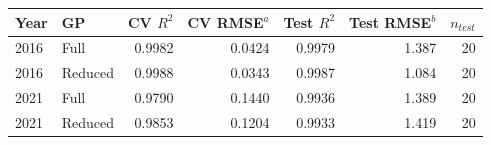 \begin{tabular}{@{}llrrrrr@{}}
\toprule
Year & GP & CV $R^2$ & CV RMSE$^{a}$ & Test $R^2$ & Test RMSE$^{b}$ & $n_{test}$ \\
\midrule
2016 & Full & 0.9982 & 0.0424 & 0.9979 & 1.387 & 20 \\
2016 & Reduced & 0.9988 & 0.0343 & 0.9987 & 1.084 & 20 \\
2021 & Full & 0.9790 & 0.1440 & 0.9936 & 1.389 & 20 \\
2021 & Reduced & 0.9853 & 0.1204 & 0.9933 & 1.419 & 20 \\
\bottomrule
\end{tabular}
